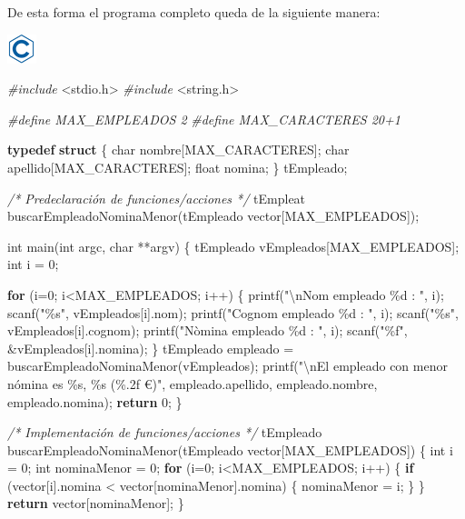 \documentclass[
]{book}
\newenvironment{Shaded}{\begin{snugshade}}{\end{snugshade}}
\newcommand{\CommentTok}[1]{\textcolor[rgb]{0.56,0.35,0.01}{\textit{#1}}}
\newcommand{\ControlFlowTok}[1]{\textcolor[rgb]{0.13,0.29,0.53}{\textbf{#1}}}
\newcommand{\DataTypeTok}[1]{\textcolor[rgb]{0.13,0.29,0.53}{#1}}
\newcommand{\DecValTok}[1]{\textcolor[rgb]{0.00,0.00,0.81}{#1}}
\newcommand{\ImportTok}[1]{#1}
\newcommand{\KeywordTok}[1]{\textcolor[rgb]{0.13,0.29,0.53}{\textbf{#1}}}
\newcommand{\NormalTok}[1]{#1}
\newcommand{\PreprocessorTok}[1]{\textcolor[rgb]{0.56,0.35,0.01}{\textit{#1}}}
\newcommand{\SpecialCharTok}[1]{\textcolor[rgb]{0.00,0.00,0.00}{#1}}
\newcommand{\StringTok}[1]{\textcolor[rgb]{0.31,0.60,0.02}{#1}}
\begin{document}
De esta forma el programa completo queda de la siguiente manera:

\includegraphics{./img/c.png}

\begin{Shaded}
\begin{Highlighting}[]
\PreprocessorTok{\#include }\ImportTok{\textless{}stdio.h\textgreater{}}
\PreprocessorTok{\#include }\ImportTok{\textless{}string.h\textgreater{}}

\PreprocessorTok{\#define MAX\_EMPLEADOS 2}
\PreprocessorTok{\#define MAX\_CARACTERES 20+1}

\KeywordTok{typedef} \KeywordTok{struct}\NormalTok{ \{}
    \DataTypeTok{char}\NormalTok{ nombre[MAX\_CARACTERES];}
    \DataTypeTok{char}\NormalTok{ apellido[MAX\_CARACTERES];}
    \DataTypeTok{float}\NormalTok{ nomina;}
\NormalTok{\} tEmpleado;}

\CommentTok{/* Predeclaración de funciones/acciones */}
\NormalTok{tEmpleat buscarEmpleadoNominaMenor(tEmpleado vector[MAX\_EMPLEADOS]);}

\DataTypeTok{int}\NormalTok{ main(}\DataTypeTok{int}\NormalTok{ argc, }\DataTypeTok{char}\NormalTok{ **argv) \{}
\NormalTok{    tEmpleado vEmpleados[MAX\_EMPLEADOS];}
    \DataTypeTok{int}\NormalTok{ i = }\DecValTok{0}\NormalTok{;}

    \ControlFlowTok{for}\NormalTok{ (i=}\DecValTok{0}\NormalTok{; i\textless{}MAX\_EMPLEADOS; i++) \{}
\NormalTok{        printf(}\StringTok{"}\SpecialCharTok{\textbackslash{}n}\StringTok{Nom empleado \%d : "}\NormalTok{, i);}
\NormalTok{        scanf(}\StringTok{"\%s"}\NormalTok{, vEmpleados[i].nom);}
\NormalTok{        printf(}\StringTok{"Cognom empleado \%d : "}\NormalTok{, i);}
\NormalTok{        scanf(}\StringTok{"\%s"}\NormalTok{, vEmpleados[i].cognom);}
\NormalTok{        printf(}\StringTok{"Nòmina empleado \%d : "}\NormalTok{, i);}
\NormalTok{        scanf(}\StringTok{"\%f"}\NormalTok{, \&vEmpleados[i].nomina);}
\NormalTok{    \}}
\NormalTok{    tEmpleado empleado = buscarEmpleadoNominaMenor(vEmpleados);}
\NormalTok{    printf(}\StringTok{"}\SpecialCharTok{\textbackslash{}n}\StringTok{El empleado con menor nómina es \%s, \%s (\%.2f €)"}\NormalTok{, empleado.apellido, empleado.nombre, empleado.nomina);}
    \ControlFlowTok{return} \DecValTok{0}\NormalTok{;}
\NormalTok{\}}

\CommentTok{/* Implementación de funciones/acciones */}
\NormalTok{tEmpleado buscarEmpleadoNominaMenor(tEmpleado vector[MAX\_EMPLEADOS]) \{}
    \DataTypeTok{int}\NormalTok{ i = }\DecValTok{0}\NormalTok{; }
    \DataTypeTok{int}\NormalTok{ nominaMenor = }\DecValTok{0}\NormalTok{;}
    \ControlFlowTok{for}\NormalTok{ (i=}\DecValTok{0}\NormalTok{; i\textless{}MAX\_EMPLEADOS; i++) \{}
        \ControlFlowTok{if}\NormalTok{ (vector[i].nomina \textless{} vector[nominaMenor].nomina) \{}
\NormalTok{            nominaMenor = i;}
\NormalTok{        \}}
\NormalTok{    \}}
    \ControlFlowTok{return}\NormalTok{ vector[nominaMenor];}
\NormalTok{\}}
\end{Highlighting}
\end{Shaded}
\end{document}
